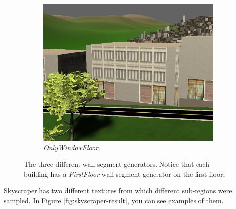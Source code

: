 \begin{figure}[H]
\begin{subfigure}[b]{0.25\textwidth}
      \includegraphics[width=\textwidth]{figure/building-only-window.PNG}
      \caption{\textit{OnlyWindowFloor}.}
  \end{subfigure}
  
  \caption{The three different wall segment generators. Notice that each building has a \textit{FirstFloor} wall segment generator on the first floor.}
  \label{fig:wall-segment-generator}
\end{figure}

Skyscraper has two different textures from which different sub-regions were sampled. In Figure \ref{fig:skyscraper-result}, you can see examples of them. 


